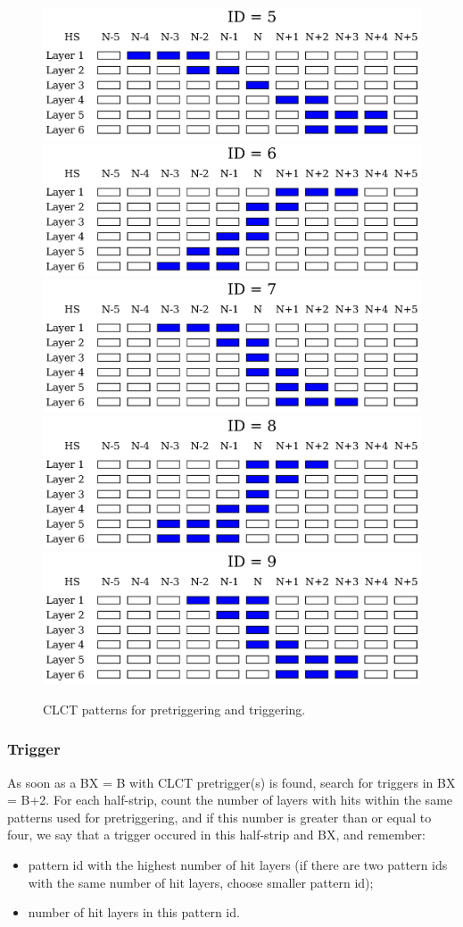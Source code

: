 \begin{figure}[tbh]
\begin{center}
                \includegraphics[width=0.48\linewidth]{figures/clct_pattern_05.pdf}\\
                \includegraphics[width=0.48\linewidth]{figures/clct_pattern_06.pdf}
                \includegraphics[width=0.48\linewidth]{figures/clct_pattern_07.pdf}\\
                \includegraphics[width=0.48\linewidth]{figures/clct_pattern_08.pdf}
                \includegraphics[width=0.48\linewidth]{figures/clct_pattern_09.pdf}
                \caption{CLCT patterns for pretriggering and triggering.}
                \label{fig:clct_pretrigger}
        \end{center}
\end{figure}

\subsubsection{Trigger}

As soon as a BX = B with CLCT pretrigger(s) is found, search for triggers in BX = B+2. For each half-strip, count the number of layers with hits within the same patterns used for pretriggering, and if this number is greater than or equal to four, we say that a trigger occured in this half-strip and BX, and remember:
\begin{itemize}
    \item pattern id with the highest number of hit layers (if there are two pattern ids with the same number of hit layers, choose smaller pattern id);
    \item number of hit layers in this pattern id.
\end{itemize}

